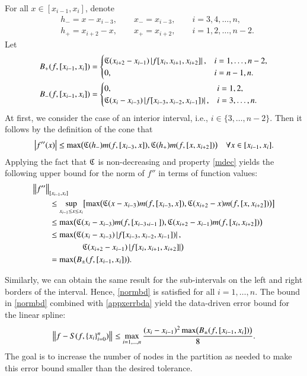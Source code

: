 \documentclass[review]{elsarticle}
\newcommand{\datasites}{\{x_i\}_{i=0}^n}
\theoremstyle{definition}
\begin{document}
For all $ x \in [x_{i-1},x_i]$,  denote
\begin{align*}
&h_- = x - x_{i-3}, \qquad x_- = x_{i-3},  \qquad i=3,4,\ldots,n,\\
 &h_+ = x_{i+2} - x, \qquad x_+ =  x_{i+2}, \qquad i=1,2,\ldots,n-2.
\end{align*}
Let
\begin{align*}
B_{+}(f,[x_{i-1},x_i])&=\begin{cases}
    \mathfrak{C}(x_{i+2}-x_{i-1})\left \lvert f[x_i,x_{i+1},x_{i+2}] \right \rvert,  & i=1,\ldots,n-2,
\\ 0, & i=n-1,n.
\end{cases}\\
 B_{-}(f,[x_{i-1},x_i])&=\begin{cases}
   0,  & i=1,2,
\\ \mathfrak{C}(x_{i}-x_{i-3})\left \lvert f[x_{i-3},x_{i-2},x_{i-1}]) \right \rvert, & i=3,\ldots,n.
\end{cases}
\end{align*}
At first, we consider the case of an interior interval, i.e., $i \in \{3, \ldots, n-2\}$. Then it follows by the definition of the cone that
\begin{equation*}
\left \lvert f''(x) \right \rvert \le \max\bigl(\mathfrak{C}(h_-)m(f,[x_{i-3},x]),\mathfrak{C}(h_+)m(f,[x,x_{i+2}])\bigr)  \quad  \forall x \in [x_{i-1},x_i].
\end{equation*}
Applying the fact that $\mathfrak{C}$ is non-decreasing and property \eqref{mdec} yields
the following upper bound for the norm of $f''$ in terms of function values:
\begin{align}\label{normbd}
\nonumber
\MoveEqLeft{\norm[{[x_{i-1},x_i]}]{f''}}\\
\nonumber
 & \le \sup_{x_{i-1} \le x \le x_i} \bigl[\max\bigl(\fC(x-x_{i-3})m(f,[x_{i-3},x]),\fC(x_{i+2}-x)m(f,[x,x_{i+2}])\bigr)\bigr]  \\
\nonumber
 & \le \max\bigl(\fC(x_{i}-x_{i-3})m(f,[x_{i-3},_{i-1}]),\fC(x_{i+2}-x_{i-1})m(f,[x_i,x_{i+2}])\bigr) \\
\nonumber & \le  \max\bigl(\fC(x_{i}-x_{i-3})\abs{f[x_{i-3},x_{i-2},x_{i-1}])},\bigr.  \\
\nonumber &\qquad  \qquad \bigl. \fC(x_{i+2}-x_{i-1})\abs{f[x_i,x_{i+1},x_{i+2}]}\bigr) \\
& = \max\bigl(B_{\pm}(f,[x_{i-1},x_i])\bigr).
\end{align}

Similarly, we can obtain the same result for the sub-intervals on the left and right borders of the interval. Hence,
\eqref{normbd} is satisfied for all $i=1,\ldots,n$.
The bound in \eqref{normbd} combined with \eqref{appxerrbda} yield the
data-driven error bound for the linear spline:
\begin{equation} \label{appxerrbdb}
\norm{f - S(f,\datasites)} \le
\max_{i=1, \ldots, n} \frac{(x_i - x_{i-1})^2\max\bigl(B_{\pm}(f,[x_{i-1},x_i])\bigr)}{8} .
\end{equation}
The goal is to increase the number of nodes in the partition as needed to make
this error bound smaller than the desired tolerance.
\end{document}
